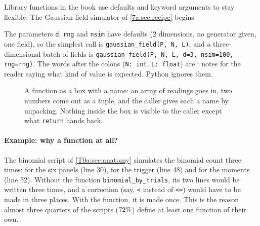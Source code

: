 Library functions in the book use defaults and keyword arguments to stay flexible. The Gaussian-field simulator of \cref{7a:sec:recipe} begins


The parameters \texttt{d}, \texttt{rng} and \texttt{nsim} have defaults ($2$ dimensions, no generator given, one field), so the simplest call is \texttt{gaussian\_field(P, N, L)}, and a three-dimensional batch of fields is \texttt{gaussian\_field(P, N, L, d=3, nsim=100, rng=rng)}. The words after the colons (\texttt{N: int}, \texttt{L: float}) are : notes for the reader saying what kind of value is expected. Python ignores them.

\begin{figure}[htbp]
\centering
{}
\caption{A function as a box with a name: an array of readings goes in, two numbers come out as a tuple, and the caller gives each a name by unpacking. Nothing inside the box is visible to the caller except what \texttt{return} hands back.}
\label{T0a:fig:function}
\end{figure}

\paragraph{Example: why a function at all?} The binomial script of \cref{T0a:sec:anatomy} simulates the binomial count three times: for the six panels (line 30), for the trigger (line 48) and for the moments (line 52). Without the function \texttt{binomial\_by\_trials}, its two lines would be written three times, and a correction (say, \texttt{<} instead of \texttt{<=}) would have to be made in three places. With the function, it is made once. This is the reason almost three quarters of the scripts ($72\%$) define at least one function of their own.

